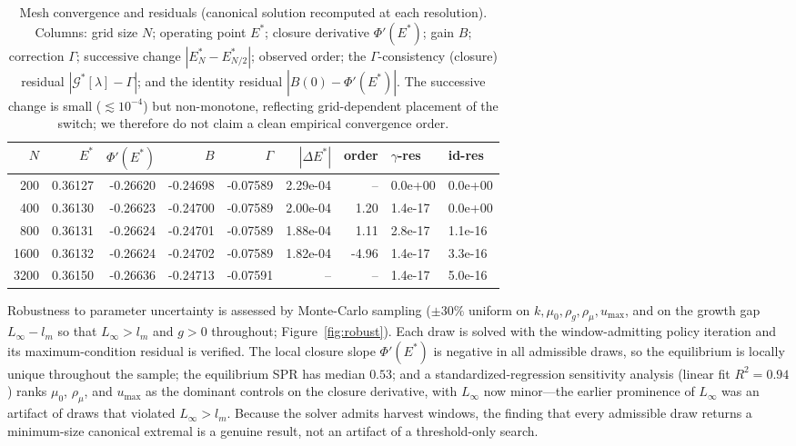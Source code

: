 \documentclass[pdflatex,sn-mathphys-num]{sn-jnl}
\theoremstyle{plain}
\theoremstyle{definition}
\theoremstyle{remark}
\begin{document}
\begin{table}[t]
\centering
\small
\caption{Mesh convergence and residuals (canonical solution recomputed at each
resolution). Columns: grid size $N$; operating point $E^*$; closure derivative
$\Phi'(E^*)$; gain $B$; correction $\Gamma$; successive change
$|E^*_N-E^*_{N/2}|$; observed order; the $\Gamma$-consistency (closure) residual
$|\mathcal G^*[\lambda]-\Gamma|$; and the identity residual $|B(0)-\Phi'(E^*)|$.
The successive change is small ($\lesssim10^{-4}$) but non-monotone, reflecting
grid-dependent placement of the switch; we therefore do not claim a clean
empirical convergence order.}
\label{tab:convergence}
\begin{tabular}{rrrrrrrll}
\toprule
$N$ & $E^*$ & $\Phi'(E^*)$ & $B$ & $\Gamma$ & $|\Delta E^*|$ & order & $\gamma$-res & id-res \\
\midrule
200 & 0.36127 & -0.26620 & -0.24698 & -0.07589 & 2.29e-04 & -- & 0.0e+00 & 0.0e+00 \\
400 & 0.36130 & -0.26623 & -0.24700 & -0.07589 & 2.00e-04 & 1.20 & 1.4e-17 & 0.0e+00 \\
800 & 0.36131 & -0.26624 & -0.24701 & -0.07589 & 1.88e-04 & 1.11 & 2.8e-17 & 1.1e-16 \\
1600 & 0.36132 & -0.26624 & -0.24702 & -0.07589 & 1.82e-04 & -4.96 & 1.4e-17 & 3.3e-16 \\
3200 & 0.36150 & -0.26636 & -0.24713 & -0.07591 & --      & -- & 1.4e-17 & 5.0e-16 \\
\bottomrule
\end{tabular}
\end{table}

Robustness to parameter uncertainty is assessed by Monte-Carlo sampling
($\pm30\%$ uniform on $k,\mu_0,\rho_g,\rho_\mu,u_{\max}$, and on the growth gap
$L_\infty-l_m$ so that $L_\infty>l_m$ and $g>0$ throughout;
Figure~\ref{fig:robust}). Each draw is solved with the window-admitting policy
iteration and its maximum-condition residual is verified. The local closure slope
$\Phi'(E^*)$ is negative in all admissible draws, so the equilibrium is
locally unique throughout the sample; the equilibrium SPR has median $0.53$; and a
standardized-regression sensitivity analysis (linear fit $R^2=0.94$) ranks
$\mu_0$, $\rho_\mu$, and $u_{\max}$ as the dominant controls on the closure
derivative, with $L_\infty$ now minor---the earlier prominence of $L_\infty$ was
an artifact of draws that violated $L_\infty>l_m$. Because the solver admits
harvest windows, the finding that every admissible draw returns a minimum-size
canonical extremal is a genuine result, not an artifact of a threshold-only
search.
\end{document}
